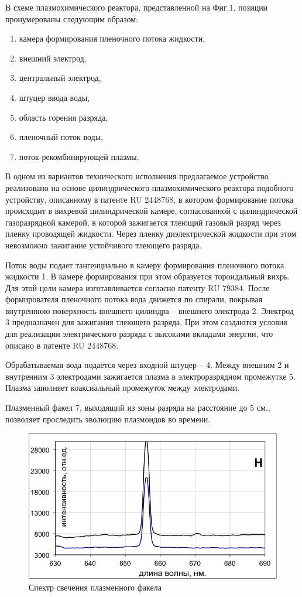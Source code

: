 \documentclass[a4paper]{article}
\begin{document}
В схеме плазмохимического реактора, представленной на Фиг.1, позиции пронумерованы следующим образом:
\begin{enumerate}
    \item камера формирования пленочного потока жидкости,
    \item внешний электрод,
    \item центральный электрод,
    \item штуцер ввода воды,
    \item область горения разряда,
    \item пленочный поток воды,
    \item поток рекомбинирующей плазмы.
\end{enumerate}
В одном из вариантов технического исполнения предлагаемое устройство реализовано на основе цилиндрического плазмохимического реактора подобного устройству, описанному в патенте RU 2448768, в котором формирование потока происходит в вихревой цилиндрической камере, согласованной с цилиндрической газоразрядной камерой, в которой зажигается тлеющий газовый разряд через пленку проводящей жидкости. Через пленку диэлектрической жидкости при этом невозможно зажигание устойчивого тлеющего разряда.

Поток воды подает тангенциально в камеру формирования пленочного потока жидкости 1. В камере формирования при этом образуется тороидальный вихрь. Для этой цели камера изготавливается согласно патенту RU 79384. После формирователя пленочного потока вода движется по спирали, покрывая внутреннюю поверхность внешнего цилиндра – внешнего электрода 2. Электрод 3 предназначен для зажигания тлеющего разряда. При этом создаются условия для реализации электрического разряда с высокими вкладами энергии, что описано в патенте RU 2448768.

Обрабатываемая вода подается через входной штуцер – 4. Между внешним 2 и внутренним 3 электродами зажигается  плазма в электроразрядном промежутке 5. Плазма заполняет коаксиальный промежуток между электродами. 

Плазменный факел 7, выходящий из зоны разряда на расстояние до 5 см., позволяет проследить эволюцию плазмоидов во времени. 

\newpage

\begin{figure}[h]
    \includegraphics{plot.png}
    \centering
    \caption{Спектр свечения плазменного факела}
\end{figure}
\end{document}
